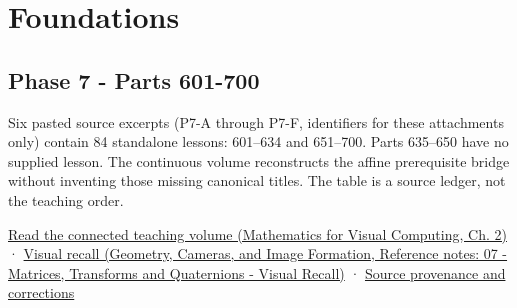 \hypertarget{appendix-fd090d982a15}{}\label{referencestart:appendix-fd090d982a15}
\section{Foundations}\label{appendix-fd090d982a15-foundations}

\subsection{Phase 7 - Parts 601-700}\label{appendix-fd090d982a15-phase-7---parts-601-700}

Six pasted source excerpts (P7-A through P7-F, identifiers for these attachments only) contain 84 standalone lessons: 601--634 and 651--700. Parts 635--650 have no supplied lesson. The continuous volume reconstructs the affine prerequisite bridge without inventing those missing canonical titles. The table is a source ledger, not the teaching order.

\href{../02-Mathematics-for-Visual-Computing/main.pdf\#nameddest=01-foundations-i-ch018-keep-the-promises-visible-while-moving-between-representations}{Read the connected teaching volume (Mathematics for Visual Computing, Ch. 2)} · \href{../03-Geometry-Cameras-and-Image-Formation/main.pdf\#nameddest=appendix-68f22c734be3}{Visual recall (Geometry, Cameras, and Image Formation, Reference notes: 07 - Matrices, Transforms and Quaternions - Visual Recall)} · \hyperref[appendix-a103e7846d21-phase-7---source-analysis-and-verification]{Source provenance and corrections}

